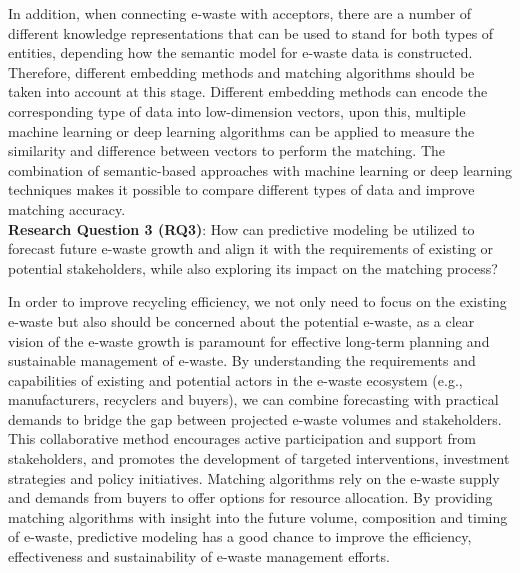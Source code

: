 \documentclass{article}
\numberwithin{equation}{section}
\begin{document}
In addition, when connecting e-waste with acceptors, there are a number of different knowledge representations that can be used to stand for both types of entities, depending how the semantic model for e-waste data is constructed. Therefore, different embedding methods and matching algorithms should be taken into account at this stage. Different embedding methods can encode the corresponding type of data into low-dimension vectors, upon this, multiple machine learning or deep learning algorithms can be applied to measure the similarity and difference between vectors to perform the matching. The combination of semantic-based approaches with machine learning or deep learning techniques makes it possible to compare different types of data and improve matching accuracy. \\

\textbf{Research Question 3 (RQ3)}: How can predictive modeling be utilized to forecast future e-waste growth and align it with the requirements of existing or potential stakeholders, while also exploring its impact on the matching process?

In order to improve recycling efficiency, we not only need to focus on the existing e-waste but also should be concerned about the potential e-waste, as a clear vision of the e-waste growth is paramount for effective long-term planning and sustainable management of e-waste. By understanding the requirements and capabilities of existing and potential actors in the e-waste ecosystem (e.g., manufacturers, recyclers and buyers), we can combine forecasting with practical demands to bridge the gap between projected e-waste volumes and stakeholders. This collaborative method encourages active participation and support from stakeholders, and promotes the development of targeted interventions, investment strategies and policy initiatives. Matching algorithms rely on the e-waste supply and demands from buyers to offer options for resource allocation. By providing matching algorithms with insight into the future volume, composition and timing of e-waste, predictive modeling has a good chance to improve the efficiency, effectiveness and sustainability of e-waste management efforts.
\end{document}
